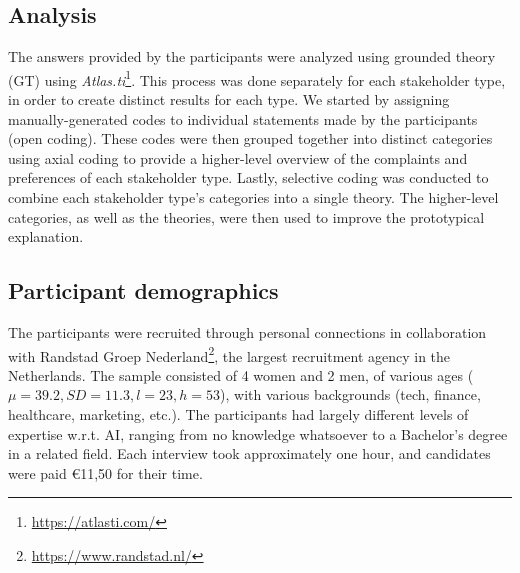 

\subsection{Analysis}
The answers provided by the participants were analyzed using grounded theory (GT) \cite{walker2006grounded} using \textit{Atlas.ti}\footnote{\url{https://atlasti.com/}}. This process was done separately for each stakeholder type, in order to create distinct results for each type. We started by assigning manually-generated codes to individual statements made by the participants (open coding). These codes were then grouped together into distinct categories using axial coding to provide a higher-level overview of the complaints and preferences of each stakeholder type. Lastly, selective coding was conducted to combine each stakeholder type's categories into a single theory. The higher-level categories, as well as the theories, were then used to improve the prototypical explanation. 

\subsection{Participant demographics}
The participants were recruited through personal connections in collaboration with Randstad Groep Nederland\footnote{\url{https://www.randstad.nl/}}, the largest recruitment agency in the Netherlands. The sample consisted of 4 women and 2 men, of various ages ($\mu = 39.2, SD = 11.3, l=23, h=53$), with various backgrounds (tech, finance, healthcare, marketing, etc.). The participants had largely different levels of expertise w.r.t. AI, ranging from no knowledge whatsoever to a Bachelor's degree in a related field. Each interview took approximately one hour, and candidates were paid \euro{11,50} for their time. 
